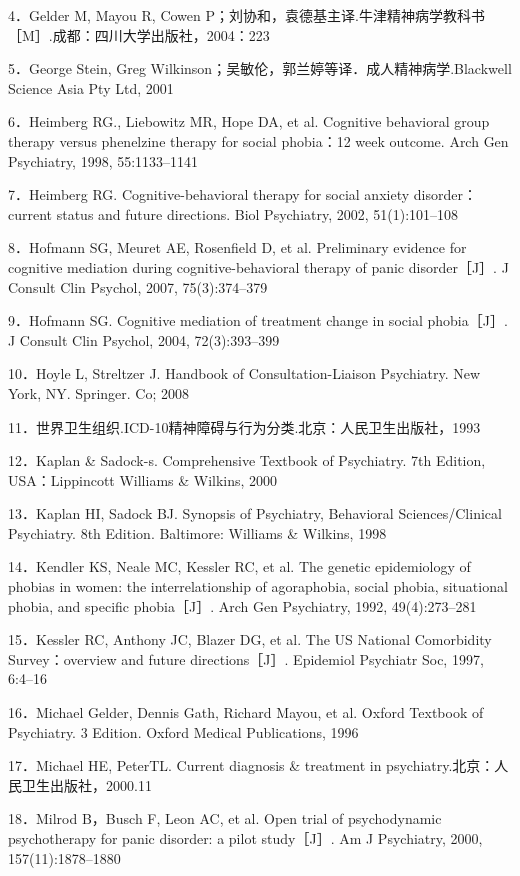 4．Gelder M, Mayou R, Cowen
P；刘协和，袁德基主译.牛津精神病学教科书［M］.成都：四川大学出版社，2004：223

5．George Stein, Greg
Wilkinson；吴敏伦，郭兰婷等译．成人精神病学.Blackwell Science Asia Pty
Ltd, 2001

6．Heimberg RG., Liebowitz MR, Hope DA, et al. Cognitive behavioral
group therapy versus phenelzine therapy for social phobia：12 week
outcome. Arch Gen Psychiatry, 1998, 55:1133--1141

7．Heimberg RG. Cognitive-behavioral therapy for social anxiety
disorder：current status and future directions. Biol Psychiatry, 2002,
51(1):101--108

8．Hofmann SG, Meuret AE, Rosenfield D, et al. Preliminary evidence for
cognitive mediation during cognitive-behavioral therapy of panic
disorder［J］. J Consult Clin Psychol, 2007, 75(3):374--379

9．Hofmann SG. Cognitive mediation of treatment change in social
phobia［J］. J Consult Clin Psychol, 2004, 72(3):393--399

10．Hoyle L, Streltzer J. Handbook of Consultation-Liaison Psychiatry.
New York, NY. Springer. Co; 2008

11．世界卫生组织.ICD-10精神障碍与行为分类.北京：人民卫生出版社，1993

12．Kaplan \& Sadock-s. Comprehensive Textbook of Psychiatry. 7th
Edition, USA：Lippincott Williams \& Wilkins, 2000

13．Kaplan HI, Sadock BJ. Synopsis of Psychiatry, Behavioral
Sciences/Clinical Psychiatry. 8th Edition. Baltimore: Williams \&
Wilkins, 1998

14．Kendler KS, Neale MC, Kessler RC, et al. The genetic epidemiology of
phobias in women: the interrelationship of agoraphobia, social phobia,
situational phobia, and specific phobia［J］. Arch Gen Psychiatry, 1992,
49(4):273--281

15．Kessler RC, Anthony JC, Blazer DG, et al. The US National
Comorbidity Survey：overview and future directions［J］. Epidemiol
Psychiatr Soc, 1997, 6:4--16

16．Michael Gelder, Dennis Gath, Richard Mayou, et al. Oxford Textbook
of Psychiatry. 3 Edition. Oxford Medical Publications, 1996

17．Michael HE, PeterTL. Current diagnosis \& treatment in
psychiatry.北京：人民卫生出版社，2000.11

18．Milrod B，Busch F, Leon AC, et al. Open trial of psychodynamic
psychotherapy for panic disorder: a pilot study［J］. Am J Psychiatry,
2000, 157(11):1878--1880

